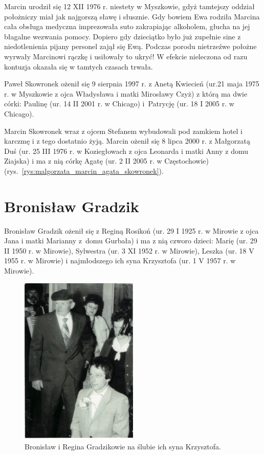 Marcin urodził się 12 XII 1976 r. niestety w Myszkowie, gdyż tamtejszy oddział położniczy miał jak najgorszą sławę i słusznie. Gdy bowiem Ewa rodziła Marcina cała obsługa medyczna imprezowała suto zakrapiając alkoholem, głucha na jej błagalne wezwania pomocy. Dopiero gdy dzieciątko było już zupełnie sine z niedotlenienia pijany personel zajął się Ewą. Podczas porodu nietrzeźwe położne wyrwały Marcinowi rączkę i usiłowały to ukryć! W efekcie nieleczona od razu kontuzja okazała się w tamtych czasach  trwała.

Paweł Skowronek ożenił się 9 sierpnia 1997 r. z Anetą Kwiecień (ur.21 maja 1975 r. w Myszkowie z ojca Władysława i matki Mirosławy Czyż) z którą ma dwie córki: Paulinę (ur. 14 II 2001 r. w Chicago) i~Patrycję  (ur. 18 I 2005 r. w Chicago).

Marcin Skowronek wraz z ojcem Stefanem wybudowali pod zamkiem hotel i karczmę i z tego dostatnio żyją. Marcin ożenił się 8 lipca 2000 r. z Małgorzatą Duś (ur. 25  III 1976 r. w Koziegłowach z ojca Leonarda i matki Anny z domu Ziajska) i ma z nią córkę Agatę (ur. 2 II 2005 r. w Częstochowie) (rys.~\ref{rys:malgorzata_marcin_agata_skowronek}).


\section{Bronisław Gradzik}
Bronisław Gradzik ożenił się z Reginą Rosikoń (ur. 29 I 1925 r. w Mirowie z ojca Jana i matki Marianny z~domu Gurbała) i ma z nią czworo dzieci: Marię (ur. 29 II 1950 r. w Mirowie), Sylwestra (ur. 3 XI 1952 r. w Mirowie), Leszka (ur. 18 V 1955 r. w Mirowie) i najmłodszego ich syna Krzysztofa (ur. 1 V 1957 r. w Mirowie). 

\begin{figure}[!h]
\begin{center}
\includegraphics[width=0.5\textwidth]{zdjecia/bronislaw_regina_krzysztof_gradzikowie.jpg}
\caption{Bronisław i Regina Gradzikowie na ślubie ich syna Krzysztofa.}
\label{rys:bronislaw_regina_krzysztof_gradzikowie}
\end{center}
\end{figure}

